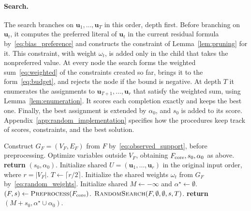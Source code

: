 \documentclass[11pt,a4paper]{article}
\theoremstyle{definition}
\theoremstyle{remark}
\begin{document}
\paragraph{Search.}
The search branches on $\mathbf u_1,\ldots,\mathbf u_T$ in this order, depth
first. Before branching on $\mathbf u_t$, it computes the preferred literal
of $\mathbf u_t$ in the current residual formula
by~\eqref{eq:bias_preference} and constructs the constraint of
Lemma~\ref{lem:pruning} for it. This constraint, with weight $\omega_t$, is
added only in the child that takes the nonpreferred value. At every node the
search forms the weighted sum~\eqref{eq:weighted} of the constraints created
so far, brings it to the form~\eqref{eq:budget}, and rejects the node if the
bound is negative. At depth $T$ it enumerates the assignments to
$\mathbf u_{T+1},\ldots,\mathbf u_r$ that satisfy the weighted sum, using
Lemma~\ref{lem:enumeration}. It scores each completion exactly and keeps the
best one. Finally, the best assignment is extended by $\alpha_0$, and $s_0$
is added to its score. Appendix~\ref{app:random_implementation} specifies
how the procedures keep track of scores, constraints, and the best
solution.

\begin{algorithm}[tp]
\caption{\textnormal{\textsc{RandomFormula}}$(F)$}\label{alg:weighted}
\begin{algorithmic}[1]
\STATE Construct $G_F=(V_F,E_F)$ from $F$ by~\eqref{eq:observed_support}, before preprocessing.
\STATE Optimize variables outside $V_F$, obtaining $F_{\rm core},s_0,\alpha_0$ as above.
  \STATE \textbf{return} $(s_0,\alpha_0)$.
\ENDIF
\STATE Initialize shared $U=(\mathbf u_1,\ldots,\mathbf u_r)$ in the original input order, where $r=|V_F|$.
\STATE $T\gets\lceil r/2\rceil$.
\STATE Initialize the shared weights $\omega_t$ from $G_F$ by~\eqref{eq:random_weights}.
\STATE Initialize shared $M\gets-\infty$ and $\alpha^\star\gets\emptyset$.
\STATE $(F,s)\gets\textnormal{\textsc{Preprocess}}(F_{\rm core})$.
\STATE $\textnormal{\textsc{RandomSearch}}(F,\emptyset,\emptyset,s,T)$.
\STATE \textbf{return} $(M+s_0,\alpha^\star\cup\alpha_0)$.
\end{algorithmic}
\end{algorithm}
\end{document}
